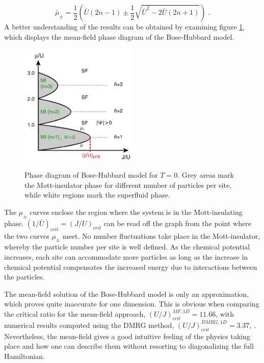 \begin{equation}
	\bar{\mu}_{\pm} = \frac{1}{2} \left( \bar{U}(2n -1) \pm \frac{1}{2} \sqrt{\bar{U}^2 - 2 \bar{U} (2 n +1)} \right) \; .
\end{equation}
A better understanding of the results can be obtained by examining figure \ref{fig:SFMOTT}, which displays the mean-field phase diagram of the Bose-Hubbard model.  
\begin{figure}[h]
	\centering
	\includegraphics[width = 0.5\textwidth]{Figures/SFMottPhase.pdf}
	\label{fig:SFMOTT}
	\caption{Phase diagram of Bose-Hubbard model for $T = 0$. Grey areas mark the Mott-insulator phase for different number of particles per site, while white regions mark the superfluid phase. \cite{greiner}}
\end{figure}
The $\mu_{\pm}$ curves enclose the region where the system is in the Mott-insulating phase. $(1/\bar{U})_{crit} = (J/U)_{crit}$ can be read off the graph from the point where the two curves $\mu_{\pm}$ meet. No number fluctuations take place in the Mott-insulator, whereby the particle number per site is well defined. As the chemical potential increases, each site can accommodate more particles as long as the increase in chemical potential compensates the increased energy due to interactions between the particles.

The mean-field solution of the Bose-Hubbard model is only an approximation, which proves quite inaccurate for one dimension. This is obvious when comparing the critical ratio for the mean-field approach, $\left( U/J \right)_{crit}^{MF,1D} = 11.66$, with numerical results computed using the DMRG method, $\left( U/J \right)_{crit}^{DMRG,1D} = 3.37$, \cite{Kuhner2000}. Nevertheless, the mean-field gives a good intuitive feeling of the physics taking place and how one can describe them without resorting to diagonalizing the full Hamiltonian.


